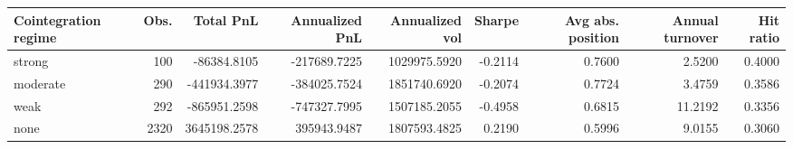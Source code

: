 \begin{tabular}{lrrrrrrrr}
\toprule
Cointegration regime & Obs. & Total PnL & Annualized PnL & Annualized vol & Sharpe & Avg abs. position & Annual turnover & Hit ratio \\
\midrule
strong & 100 & -86384.8105 & -217689.7225 & 1029975.5920 & -0.2114 & 0.7600 & 2.5200 & 0.4000 \\
moderate & 290 & -441934.3977 & -384025.7524 & 1851740.6920 & -0.2074 & 0.7724 & 3.4759 & 0.3586 \\
weak & 292 & -865951.2598 & -747327.7995 & 1507185.2055 & -0.4958 & 0.6815 & 11.2192 & 0.3356 \\
none & 2320 & 3645198.2578 & 395943.9487 & 1807593.4825 & 0.2190 & 0.5996 & 9.0155 & 0.3060 \\
\bottomrule
\end{tabular}
